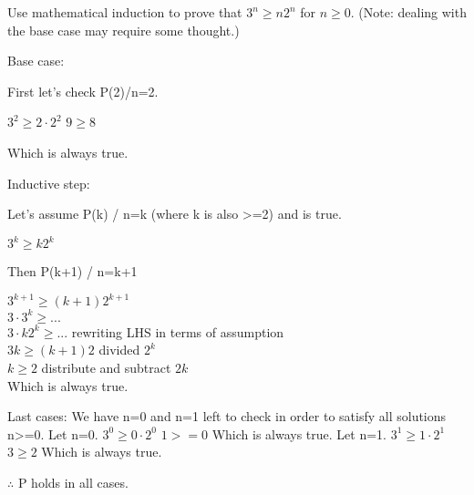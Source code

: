 
\begin{problem}
Use mathematical induction to prove that $3^n \ge n2^n$ for $n\ge 0$. 
(Note: dealing with the base case may require some thought.)
\end{problem}

\begin{flushleft}
Base case:

First let's check P(2)/n=2.

$3^2 \ge 2\cdot2^2$
$9 \ge 8$

Which is always true.

\vskip 0.1in
Inductive step:

Let's assume P(k) / n=k (where k is also >=2) and is true.

$3^k \ge k2^k$

Then P(k+1) / n=k+1

$3^{k+1} \ge (k+1)2^{k+1}$ \\
$3\cdot3^k \ge ...$  \\
$3\cdot k 2^k \ge ...$ rewriting LHS in terms of assumption \\
$3k \ge (k+1)2$ divided $2^k$ \\
$k \ge 2$ distribute and subtract $2k$ \\
Which is always true.

\vskip 0.1in
Last cases:
We have n=0 and n=1 left to check in order to satisfy all solutions n>=0.
Let n=0.
$3^0 \ge 0\cdot2^0$
$1 >= 0$
Which is always true.
Let n=1.
$3^1 \ge 1\cdot2^1$
$3 \ge 2$
Which is always true.

\vskip 0.1in
$\therefore$ P holds in all cases.

\end{flushleft}



